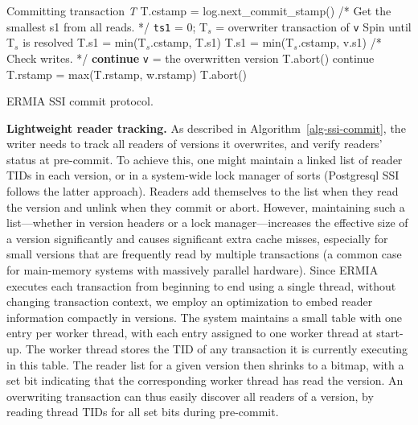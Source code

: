 \begin{algorithm}
\begin{algorithmic}[1]
 Committing transaction \textit{T}
\STATE T.cstamp = log.next\_commit\_stamp()
\STATE /* Get the smallest s1 from all reads. */
\STATE \texttt{ts1} = 0;
\STATE T$_s$ = overwriter transaction of \texttt{v}
\STATE Spin until T$_s$ is resolved
\STATE T.s1 = min(T$_s$.cstamp, T.s1)
\ENDIF
\ELSE
\STATE T.s1 = min(T$_s$.cstamp, v.s1)
\ENDIF
\ENDFOR
\STATE
\STATE /* Check writes. */
\STATE \textbf{continue}
\ENDIF
\STATE \texttt{v} = the overwritten version
\STATE T.abort()
\ENDIF
{}
\STATE continue
\ENDIF
\STATE T.rstamp = max(T.rstamp, w.rstamp)
\STATE T.abort()
\ENDIF
\ENDFOR
\ENDFOR
\end{algorithmic}
\label{alg-ssi-commit}
\caption{ERMIA SSI commit protocol.}
\end{algorithm}

{\bf Lightweight reader tracking.}
As described in Algorithm~\ref{alg-ssi-commit}, the writer needs to track all readers of versions it overwrites, and verify readers' status at pre-commit. To achieve this, one might maintain a linked list of reader TIDs in each version, or in a system-wide lock manager of sorts (Postgresql SSI follows the latter approach). Readers add themselves to the list when they read the version and unlink when they commit or abort. However, maintaining such a list---whether in version headers or a lock manager---increases the effective size of a version significantly and causes significant extra cache misses, especially for small versions that are frequently read by multiple transactions (a common case for main-memory systems with massively parallel hardware). Since ERMIA executes each transaction from beginning to end using a single thread, without changing transaction context, we employ an optimization to embed reader information compactly in versions. The system maintains a small table with one entry per worker thread, with each entry assigned to one worker thread at start-up. The worker thread stores the TID of any transaction it is currently executing in this table. The reader list for a given version then shrinks to a bitmap, with a set bit indicating that the corresponding worker thread has read the version. An overwriting transaction can thus easily discover all readers of a version, by reading thread TIDs for all set bits during pre-commit.

